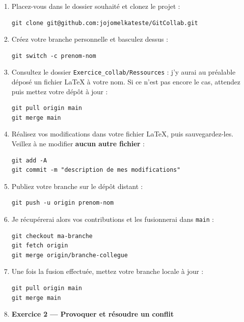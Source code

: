 \documentclass[11pt,a4paper]{article}
\begin{document}
\begin{enumerate}
	\item Placez-vous dans le dossier souhaité et clonez le projet :
	\begin{lstlisting}[style=bashstyle]
git clone git@github.com:jojomelkateste/GitCollab.git
	\end{lstlisting}
	
	\item Créez votre branche personnelle et basculez dessus :
	\begin{lstlisting}[style=bashstyle]
git switch -c prenom-nom
	\end{lstlisting}
	
	\item Consultez le dossier \texttt{Exercice\_collab/Ressources} : j'y aurai au préalable 
	déposé un fichier \LaTeX{} à votre nom. Si ce n'est pas encore le cas, attendez puis 
	mettez votre dépôt à jour :
	\begin{lstlisting}[style=bashstyle]
git pull origin main
git merge main
	\end{lstlisting}
	
	\item Réalisez vos modifications dans votre fichier \LaTeX{}, puis sauvegardez-les.
	Veillez à ne modifier \textbf{aucun autre fichier} :
	\begin{lstlisting}[style=bashstyle]
git add -A
git commit -m "description de mes modifications"
	\end{lstlisting}
	
	\item Publiez votre branche sur le dépôt distant :
	\begin{lstlisting}[style=bashstyle]
git push -u origin prenom-nom
	\end{lstlisting}
	
	\item Je récupérerai alors vos contributions et les fusionnerai dans \texttt{main} :
	\begin{lstlisting}[style=bashstyle]
git checkout ma-branche
git fetch origin
git merge origin/branche-collegue
	\end{lstlisting}
	
	\item Une fois la fusion effectuée, mettez votre branche locale à jour :
	\begin{lstlisting}[style=bashstyle]
git pull origin main
git merge main
	\end{lstlisting}
	\setcounter{enumi}{8} %
	\item \textbf{Exercice 2 — Provoquer et résoudre un conflit}
	

\end{enumerate}
\end{document}
